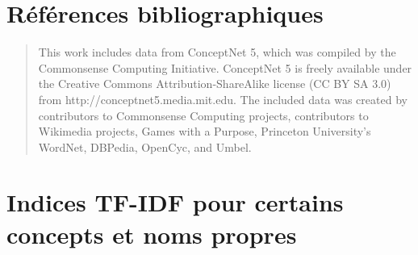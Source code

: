\documentclass[a4paper, 12pt]{article}
\begin{document}







 

\section{Références bibliographiques}

\begin{quotation}
 This work includes data from ConceptNet 5, which was compiled by the Commonsense Computing Initiative. ConceptNet 5 is freely available under the Creative Commons Attribution-ShareAlike license (CC BY SA 3.0) from http://conceptnet5.media.mit.edu. The included data was created by contributors to Commonsense Computing projects, contributors to Wikimedia projects, Games with a Purpose, Princeton University's WordNet, DBPedia, OpenCyc, and Umbel.
\end{quotation}

\nocite{*}
\printbibliography{}

\newpage
\appendix

\section{Indices TF-IDF pour certains concepts et noms propres}
\end{document}

